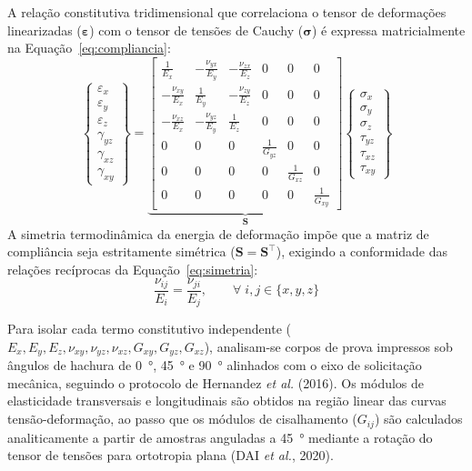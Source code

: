 A relação constitutiva tridimensional que correlaciona o tensor de deformações linearizadas ($\boldsymbol{\varepsilon}$) com o tensor de tensões de Cauchy ($\boldsymbol{\sigma}$) é expressa matricialmente na Equação~\eqref{eq:compliancia}:
\begin{equation}
  \begin{Bmatrix} \varepsilon_x \\ \varepsilon_y \\ \varepsilon_z \\ \gamma_{yz} \\ \gamma_{xz} \\ \gamma_{xy} \end{Bmatrix}
  =
  \underbrace{\begin{bmatrix}
    \frac{1}{E_x} & -\frac{\nu_{yx}}{E_y} & -\frac{\nu_{zx}}{E_z} & 0 & 0 & 0 \\
    -\frac{\nu_{xy}}{E_x} & \frac{1}{E_y} & -\frac{\nu_{zy}}{E_z} & 0 & 0 & 0 \\
    -\frac{\nu_{xz}}{E_x} & -\frac{\nu_{yz}}{E_y} & \frac{1}{E_z} & 0 & 0 & 0 \\
    0 & 0 & 0 & \frac{1}{G_{yz}} & 0 & 0 \\
    0 & 0 & 0 & 0 & \frac{1}{G_{xz}} & 0 \\
    0 & 0 & 0 & 0 & 0 & \frac{1}{G_{xy}}
  \end{bmatrix}}_{\mathbf{S}}
  \begin{Bmatrix} \sigma_x \\ \sigma_y \\ \sigma_z \\ \tau_{yz} \\ \tau_{xz} \\ \tau_{xy} \end{Bmatrix}
  \label{eq:compliancia}
\end{equation}
A simetria termodinâmica da energia de deformação impõe que a matriz de compliância seja estritamente simétrica ($\mathbf{S} = \mathbf{S}^{\top}$), exigindo a conformidade das relações recíprocas da Equação~\eqref{eq:simetria}:
\begin{equation}
  \frac{\nu_{ij}}{E_i} = \frac{\nu_{ji}}{E_j}, \qquad \forall \; i,j \in \{x,y,z\}
  \label{eq:simetria}
\end{equation}

Para isolar cada termo constitutivo independente ($E_x, E_y, E_z, \nu_{xy}, \nu_{yz}, \nu_{xz}, G_{xy}, G_{yz}, G_{xz}$), analisam-se corpos de prova impressos sob ângulos de hachura de \SI{0}{\degree}, \SI{45}{\degree} e \SI{90}{\degree} alinhados com o eixo de solicitação mecânica, seguindo o protocolo de Hernandez \textit{et al.} (2016). Os módulos de elasticidade transversais e longitudinais são obtidos na região linear das curvas tensão-deformação, ao passo que os módulos de cisalhamento ($G_{ij}$) são calculados analiticamente a partir de amostras anguladas a \SI{45}{\degree} mediante a rotação do tensor de tensões para ortotropia plana (DAI \textit{et al.}, 2020).

